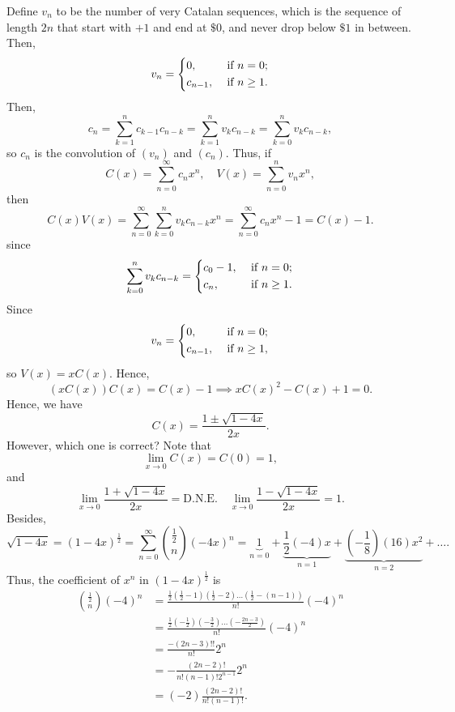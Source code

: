 Define \(v_n\) to be the number of very Catalan sequences, which is the sequence of length \(2n\) that start with \(+1\) and end at \(\$0\), and never drop below \(\$ 1\) in between. Then, 
\[
    v_n = \begin{dcases}
        0, &\text{ if } n=0 ;\\
        c_{n-1}, &\text{ if } n \ge 1 .
    \end{dcases}
\]     
Then, 
\[
    c_n = \sum_{k=1}^n c_{k-1} c_{n-k} = \sum_{k=1}^n v_k c_{n-k} = \sum_{k=0}^n v_k c_{n-k}, 
\] so \(c_n\) is the convolution of \((v_n)\) and \((c_n)\).   
Thus, if 
\[
    C(x) = \sum_{n=0}^{\infty} c_n x^n, \quad V(x) = \sum_{n=0}^n v_n x^n,  
\]
then 
\[
    C(x) V(x) = \sum_{n=0}^{\infty} \sum_{k=0}^{n} v_k c_{n-k} x^n = \sum_{n=0}^{\infty} c_n x^n - 1 = C(x) - 1.   
\] since 
\[
    \sum_{k=0}^n v_k c_{n-k} = \begin{dcases}
        c_0 - 1, &\text{ if } n=0  ;\\
        c_n, &\text{ if }  n \ge 1.
    \end{dcases} 
\]
Since 
\[
    v_n = \begin{dcases}
        0, &\text{ if } n=0 ;\\
        c_{n-1}, &\text{ if } n \ge 1,
    \end{dcases}
\]
so \(V(x) = x C(x)\). 
Hence, 
\[
    \left( x C(x) \right) C(x) = C(x) - 1 \implies x C(x)^2 - C(x) + 1 = 0. 
\]
Hence, we have 
\[
    C(x) = \frac{1 \pm \sqrt{1 - 4x} }{2x}.
\]
However, which one is correct? Note that 
\[
    \lim_{x \to 0} C(x) = C(0) = 1, 
\]
and 
\[
    \lim_{x \to 0} \frac{1 + \sqrt{1 - 4x} }{2x} = \mathrm{D.N.E.}  \quad \lim_{x \to 0} \frac{1 - \sqrt{1 - 4x} }{2x} = 1.  
\]
Besides, 
\[
    \sqrt{1 - 4x} = (1 - 4x)^{\frac{1}{2}} = \sum_{n=0}^{\infty} \binom{\frac{1}{2}}{n}(-4x)^n = \underbrace{1}_{n=0} + \underbrace{\frac{1}{2}(-4)x}_{n=1} + \underbrace{\left( -\frac{1}{8} \right)(16)x^2 }_{n=2} + \dots.  
\]
Thus, the coefficient of \(x^n\) in \((1 - 4x)^{\frac{1}{2}}\) is 
\begin{align*}
    \binom{\frac{1}{2}}{n}(-4)^n &= \frac{\frac{1}{2} \left( \frac{1}{2} - 1 \right)\left( \frac{1}{2} - 2 \right) \dots \left( \frac{1}{2} - (n - 1) \right)   }{n!}(-4)^n \\
    &= \frac{\frac{1}{2} \left( -\frac{1}{2} \right) \left( -\frac{3}{2} \right) \dots \left( - \frac{2n - 3}{2} \right)   }{n!}(-4)^n \\
    &= \frac{-(2n - 3)!!}{n!} 2^n \\
    &= - \frac{(2n - 2)!}{n!(n-1)!2^{n-1}}2^n \\
    &= (-2) \frac{(2n - 2)!}{n! (n-1)!}.
\end{align*} 

